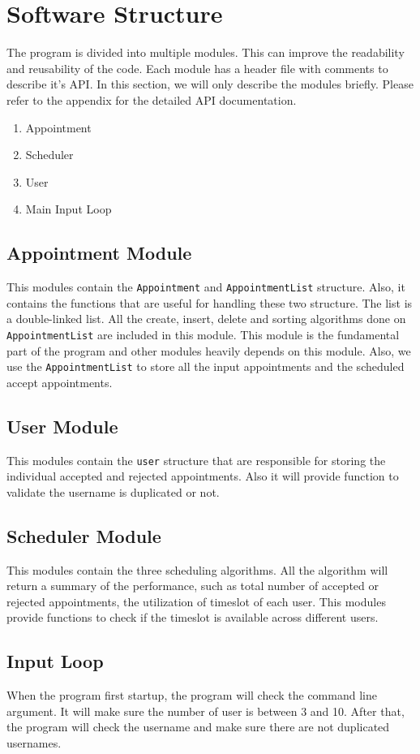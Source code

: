 \documentclass[12pt,a4paper]{report}
\begin{document}
\section{Software Structure}
The program is divided into multiple modules. This can improve the readability and reusability of the code. Each module has a header file with comments to describe it's API. In this section, we will only describe the modules briefly. Please refer to the appendix for the detailed API documentation.
\begin{enumerate}
\item Appointment
\item Scheduler
\item User
\item Main Input Loop
\end{enumerate}
\subsection{Appointment Module}
This modules contain the \texttt{Appointment} and \texttt{AppointmentList} structure. Also, it contains the functions that are useful for handling these two structure. The list is a double-linked list. All the create, insert, delete and sorting algorithms done on \texttt{AppointmentList} are included in this module. This module is the fundamental part of the program and other modules heavily depends on this module. Also, we use the \texttt{AppointmentList} to store all the input appointments and the scheduled accept appointments.
\subsection{User Module}
This modules contain the \texttt{user} structure that are responsible for storing the individual accepted and rejected appointments. Also it will provide function to validate the username is duplicated or not.
\subsection{Scheduler Module}
This modules contain the three scheduling algorithms. All the algorithm will return a summary of the performance, such as total number of accepted or rejected appointments, the utilization of timeslot of each user. This modules provide functions to check if the timeslot is available across different users.

\subsection{Input Loop}
When the program first startup, the program will check the command line argument. It will make sure the number of user is between 3 and 10. After that, the program will check the username and make sure there are not duplicated usernames.
\end{document}
